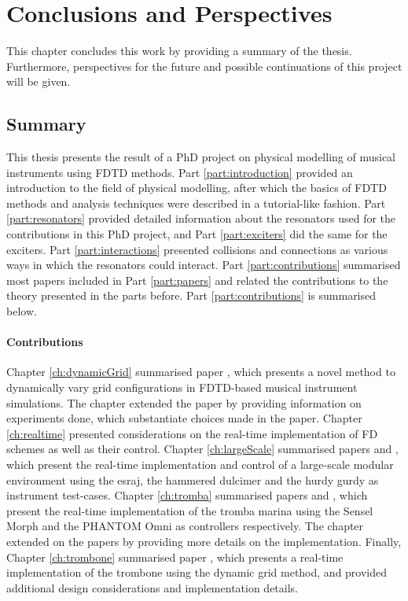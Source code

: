 \chapter{Conclusions and Perspectives}\label{ch:conclusion}
This chapter concludes this work by providing a summary of the thesis. Furthermore, perspectives for the future and possible continuations of this project will be given.

\section{Summary}
This thesis presents the result of a PhD project on physical modelling of musical instruments using FDTD methods.
Part \ref{part:introduction} provided an introduction to the field of physical modelling, after which the basics of FDTD methods and analysis techniques were described in a tutorial-like fashion. Part \ref{part:resonators} provided detailed information about the resonators used for the contributions in this PhD project, and Part \ref{part:exciters} did the same for the exciters. Part \ref{part:interactions} presented collisions and connections as various ways in which the resonators could interact. Part \ref{part:contributions} summarised most papers included in Part \ref{part:papers} and related the contributions to the theory presented in the parts before. Part \ref{part:contributions} is summarised below.
\subsubsection{Contributions}
Chapter \ref{ch:dynamicGrid} summarised paper \citeP[G], which presents a novel method to dynamically vary grid configurations in FDTD-based musical instrument simulations. The chapter extended the paper by providing information on experiments done, which substantiate choices made in the paper. 
Chapter \ref{ch:realtime} presented considerations on the real-time implementation of FD schemes as well as their control. 
Chapter \ref{ch:largeScale} summarised papers \citeP[A] and \citeP[B], which present the real-time implementation and control of a large-scale modular environment using the esraj, the hammered dulcimer and the hurdy gurdy as instrument test-cases. 
Chapter \ref{ch:tromba} summarised papers \citeP[D] and \citeP[E], which present the real-time implementation of the tromba marina using the Sensel Morph and the PHANTOM Omni as controllers respectively. The chapter extended on the papers by providing more details on the implementation. Finally, Chapter \ref{ch:trombone} summarised paper \citeP[H], which presents a real-time implementation of the trombone using the dynamic grid method, and provided additional design considerations and implementation details.

